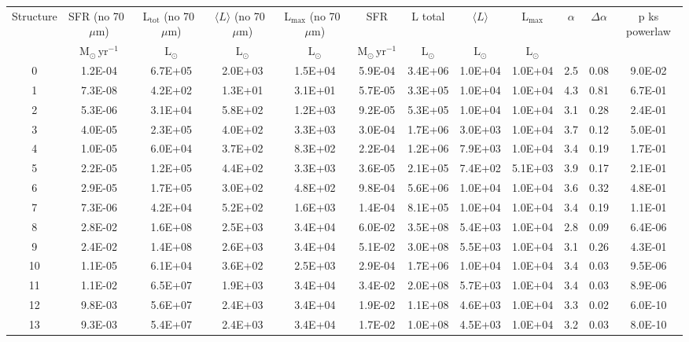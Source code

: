 \begin{tabular}{cccccccccccc}
Structure & SFR (no 70~$\mu$m) & L$_{\textrm{tot}}$ (no 70~$\mu$m) & $\langle L \rangle$ (no 70~$\mu$m) & L$_{\textrm{max}}$ (no 70~$\mu$m) & SFR & L total & $\langle L \rangle$ & L$_{\textrm{max}}$ & $\alpha$ & $\Delta \alpha$ & p ks powerlaw \\
 & $\mathrm{M_{\odot}\,yr^{-1}}$ & $\mathrm{L_{\odot}}$ & $\mathrm{L_{\odot}}$ & $\mathrm{L_{\odot}}$ & $\mathrm{M_{\odot}\,yr^{-1}}$ & $\mathrm{L_{\odot}}$ & $\mathrm{L_{\odot}}$ & $\mathrm{L_{\odot}}$ &  &  &  \\
0 & 1.2E-04 & 6.7E+05 & 2.0E+03 & 1.5E+04 & 5.9E-04 & 3.4E+06 & 1.0E+04 & 1.0E+04 & 2.5 & 0.08 & 9.0E-02 \\
1 & 7.3E-08 & 4.2E+02 & 1.3E+01 & 3.1E+01 & 5.7E-05 & 3.3E+05 & 1.0E+04 & 1.0E+04 & 4.3 & 0.81 & 6.7E-01 \\
2 & 5.3E-06 & 3.1E+04 & 5.8E+02 & 1.2E+03 & 9.2E-05 & 5.3E+05 & 1.0E+04 & 1.0E+04 & 3.1 & 0.28 & 2.4E-01 \\
3 & 4.0E-05 & 2.3E+05 & 4.0E+02 & 3.3E+03 & 3.0E-04 & 1.7E+06 & 3.0E+03 & 1.0E+04 & 3.7 & 0.12 & 5.0E-01 \\
4 & 1.0E-05 & 6.0E+04 & 3.7E+02 & 8.3E+02 & 2.2E-04 & 1.2E+06 & 7.9E+03 & 1.0E+04 & 3.4 & 0.19 & 1.7E-01 \\
5 & 2.2E-05 & 1.2E+05 & 4.4E+02 & 3.3E+03 & 3.6E-05 & 2.1E+05 & 7.4E+02 & 5.1E+03 & 3.9 & 0.17 & 2.1E-01 \\
6 & 2.9E-05 & 1.7E+05 & 3.0E+02 & 4.8E+02 & 9.8E-04 & 5.6E+06 & 1.0E+04 & 1.0E+04 & 3.6 & 0.32 & 4.8E-01 \\
7 & 7.3E-06 & 4.2E+04 & 5.2E+02 & 1.6E+03 & 1.4E-04 & 8.1E+05 & 1.0E+04 & 1.0E+04 & 3.4 & 0.19 & 1.1E-01 \\
8 & 2.8E-02 & 1.6E+08 & 2.5E+03 & 3.4E+04 & 6.0E-02 & 3.5E+08 & 5.4E+03 & 1.0E+04 & 2.8 & 0.09 & 6.4E-06 \\
9 & 2.4E-02 & 1.4E+08 & 2.6E+03 & 3.4E+04 & 5.1E-02 & 3.0E+08 & 5.5E+03 & 1.0E+04 & 3.1 & 0.26 & 4.3E-01 \\
10 & 1.1E-05 & 6.1E+04 & 3.6E+02 & 2.5E+03 & 2.9E-04 & 1.7E+06 & 1.0E+04 & 1.0E+04 & 3.4 & 0.03 & 9.5E-06 \\
11 & 1.1E-02 & 6.5E+07 & 1.9E+03 & 3.4E+04 & 3.4E-02 & 2.0E+08 & 5.7E+03 & 1.0E+04 & 3.4 & 0.03 & 8.9E-06 \\
12 & 9.8E-03 & 5.6E+07 & 2.4E+03 & 3.4E+04 & 1.9E-02 & 1.1E+08 & 4.6E+03 & 1.0E+04 & 3.3 & 0.02 & 6.0E-10 \\
13 & 9.3E-03 & 5.4E+07 & 2.4E+03 & 3.4E+04 & 1.7E-02 & 1.0E+08 & 4.5E+03 & 1.0E+04 & 3.2 & 0.03 & 8.0E-10 \\

\end{tabular}
